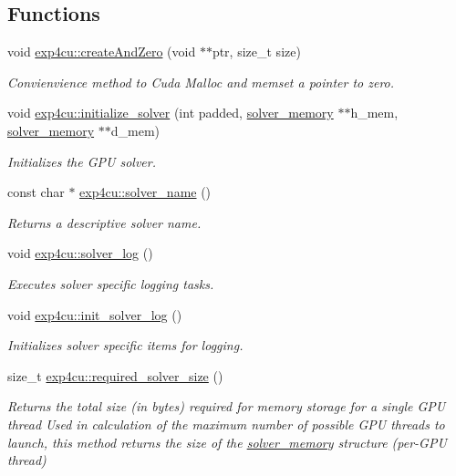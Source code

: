 \subsection*{Functions}
\begin{DoxyCompactItemize}
\item 
void \hyperlink{namespaceexp4cu_abcdabb48b002afcaf4520f85bb06c156}{exp4cu\+::create\+And\+Zero} (void $\ast$$\ast$ptr, size\+\_\+t size)
\begin{DoxyCompactList}\small\item\em Convienvience method to Cuda Malloc and memset a pointer to zero. \end{DoxyCompactList}\item 
void \hyperlink{namespaceexp4cu_aa57e5681ad1b4e46c67d24d12d64e435}{exp4cu\+::initialize\+\_\+solver} (int padded, \hyperlink{structsolver__memory}{solver\+\_\+memory} $\ast$$\ast$h\+\_\+mem, \hyperlink{structsolver__memory}{solver\+\_\+memory} $\ast$$\ast$d\+\_\+mem)
\begin{DoxyCompactList}\small\item\em Initializes the G\+PU solver. \end{DoxyCompactList}\item 
const char $\ast$ \hyperlink{namespaceexp4cu_ad9fad26aa869ef1c6b7fc061e1e6abc3}{exp4cu\+::solver\+\_\+name} ()
\begin{DoxyCompactList}\small\item\em Returns a descriptive solver name. \end{DoxyCompactList}\item 
void \hyperlink{namespaceexp4cu_a042f555823c136890f60ab28454daf9e}{exp4cu\+::solver\+\_\+log} ()
\begin{DoxyCompactList}\small\item\em Executes solver specific logging tasks. \end{DoxyCompactList}\item 
void \hyperlink{namespaceexp4cu_a128b314d7c6b2521bbd64653dc8b9826}{exp4cu\+::init\+\_\+solver\+\_\+log} ()
\begin{DoxyCompactList}\small\item\em Initializes solver specific items for logging. \end{DoxyCompactList}\item 
size\+\_\+t \hyperlink{namespaceexp4cu_a4d5db66ace53978d01e1975e47e30655}{exp4cu\+::required\+\_\+solver\+\_\+size} ()
\begin{DoxyCompactList}\small\item\em Returns the total size (in bytes) required for memory storage for a single G\+PU thread Used in calculation of the maximum number of possible G\+PU threads to launch, this method returns the size of the \hyperlink{structexp4cu_1_1solver__memory}{solver\+\_\+memory} structure (per-\/\+G\+PU thread) \end{DoxyCompactList}\item 
$$
\end{DoxyCompactItemize}
